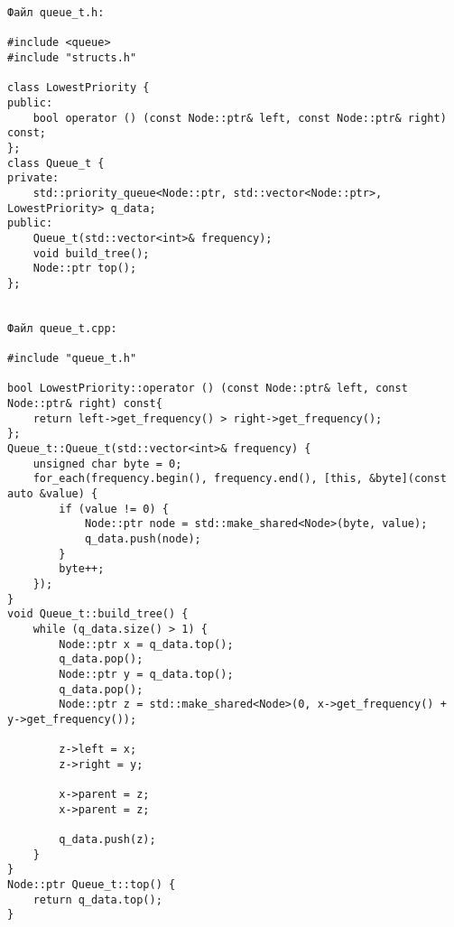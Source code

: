 \begin{verbatim}
Файл queue_t.h:

#include <queue>
#include "structs.h"

class LowestPriority {
public:
    bool operator () (const Node::ptr& left, const Node::ptr& right) const;
};
class Queue_t {
private:
    std::priority_queue<Node::ptr, std::vector<Node::ptr>, LowestPriority> q_data;
public:
    Queue_t(std::vector<int>& frequency);
    void build_tree();
    Node::ptr top();
};


Файл queue_t.cpp:

#include "queue_t.h"

bool LowestPriority::operator () (const Node::ptr& left, const Node::ptr& right) const{
    return left->get_frequency() > right->get_frequency();
};
Queue_t::Queue_t(std::vector<int>& frequency) {
    unsigned char byte = 0;
    for_each(frequency.begin(), frequency.end(), [this, &byte](const auto &value) {
        if (value != 0) {
            Node::ptr node = std::make_shared<Node>(byte, value);
            q_data.push(node);
        }
        byte++;
    });
}
void Queue_t::build_tree() {
    while (q_data.size() > 1) {
        Node::ptr x = q_data.top();
        q_data.pop();
        Node::ptr y = q_data.top();
        q_data.pop();
        Node::ptr z = std::make_shared<Node>(0, x->get_frequency() + y->get_frequency());

        z->left = x;
        z->right = y;

        x->parent = z;
        x->parent = z;

        q_data.push(z);
    }
}
Node::ptr Queue_t::top() {
    return q_data.top();
}
\end{verbatim}
